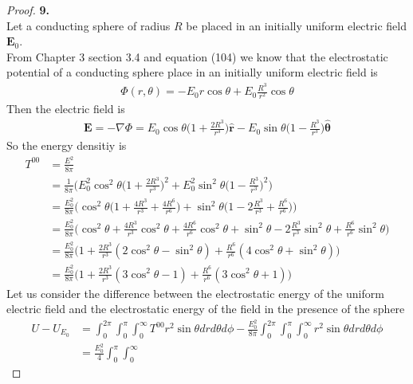 \documentclass[11pt]{article}
\newcommand{\hatr}{\bm{\hat{r}}}
\newcommand{\hattheta}{\bm{\hat{\theta}}}
\theoremstyle{definition}
\begin{document}
\cleardoublepage
\begin{proof}{\textbf{9.}}\\
Let a conducting sphere of radius $R$ be placed in an initially  uniform
electric field $\bm{E}_0$.
\\
From Chapter 3 section 3.4 and equation (104) we know that the electrostatic
potential of a conducting sphere place in an initially uniform electric field
is 
\begin{align*}
    \Phi(r,\theta) = -E_0 r\cos\theta + E_0\frac{R^3}{r^2}\cos\theta
\end{align*}
Then the electric field is
\begin{align*}
    \bm{E} = -\nabla \Phi
    = E_0\cos\theta\bigg(1 + \frac{2R^3}{r^3}\bigg)\hatr
    - E_0 \sin\theta\bigg(1 - \frac{R^3}{r^3}\bigg)\hattheta
\end{align*}
So the energy densitiy is
\begin{align*}
    T^{00} &= \frac{E^2}{8\pi}\\
    &= \frac{1}{8\pi} \bigg(
        E_0^2\cos^2\theta\bigg(1 + \frac{2R^3}{r^3}\bigg)^2
        + E_0^2 \sin^2\theta\bigg(1 - \frac{R^3}{r^3}\bigg)^2
    \bigg)\\
    &= \frac{E_0^2}{8\pi} \bigg(
        \cos^2\theta\bigg(1 + \frac{4R^3}{r^3} + \frac{4R^6}{r^6}\bigg)
        + \sin^2\theta\bigg(1 - 2\frac{R^3}{r^3} + \frac{R^6}{r^6}\bigg)
    \bigg)\\
    &= \frac{E_0^2}{8\pi} \bigg(
        \cos^2\theta + \frac{4R^3}{r^3}\cos^2\theta + \frac{4R^6}{r^6}\cos^2\theta
        + \sin^2\theta - 2\frac{R^3}{r^3}\sin^2\theta + \frac{R^6}{r^6}\sin^2\theta
    \bigg)\\
    &= \frac{E_0^2}{8\pi} \bigg(
        1 + \frac{2R^3}{r^3}(2\cos^2\theta - \sin^2\theta)
        + \frac{R^6}{r^6}(4\cos^2\theta + \sin^2\theta)
    \bigg)\\
    &= \frac{E_0^2}{8\pi} \bigg(
        1 + \frac{2R^3}{r^3}(3\cos^2\theta - 1)
        + \frac{R^6}{r^6}(3\cos^2\theta + 1)
    \bigg)
\end{align*}
Let us consider the difference between the electrostatic energy of the uniform
electric field and the electrostatic energy of the field in the presence of
the sphere
\begin{align*}
    U - U_{E_0} &= \int_{0}^{2\pi}\int_{0}^{\pi}\int_{0}^\infty
    T^{00} r^2\sin\theta drd\theta d\phi
    - \frac{E_0^2}{8\pi}\int_{0}^{2\pi}\int_{0}^{\pi}\int_{0}^\infty
    r^2\sin\theta drd\theta d\phi\\
    &= \frac{E_0^2}{4}\int_{0}^{\pi}\int_{0}^\infty

\end{align*}
\end{proof}
\end{document}
